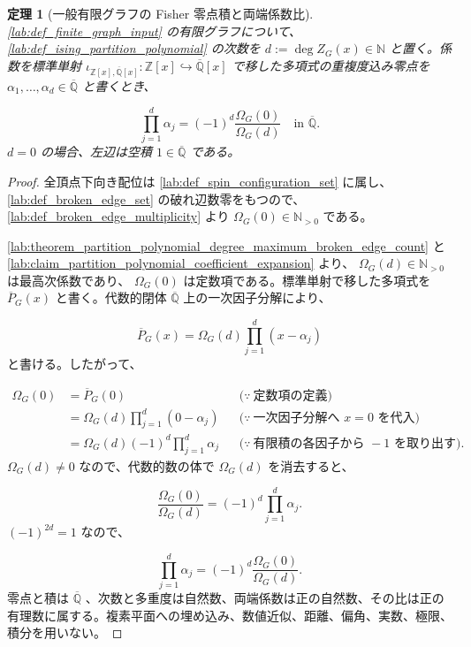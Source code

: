 \documentclass[11pt,a4paper]{article}
\newtheorem{theorem}[definition]{定理}
\theoremstyle{remark}
\begin{document}
\begin{theorem}[一般有限グラフの Fisher 零点積と両端係数比]\label{lab:theorem_fisher_zero_product_coefficient_ratio}
\cref{lab:def_finite_graph_input}
 の有限グラフについて、
\cref{lab:def_ising_partition_polynomial}
 の次数を
$d:=\deg Z_G(x)\in\mathbb N$
 と置く。係数を標準単射
$\iota_{\mathbb Z[x],\overline{\mathbb Q}[x]}:\mathbb Z[x]\hookrightarrow\overline{\mathbb Q}[x]$
 で移した多項式の重複度込み零点を 
$\alpha_1,\ldots,\alpha_d\in\overline{\mathbb Q}$
 と書くとき、

\[\prod_{j=1}^{d}\alpha_j
=
(-1)^d\frac{\Omega_G(0)}{\Omega_G(d)}
\quad\text{in }\overline{\mathbb Q}.\]
$d=0$
 の場合、左辺は空積 
$1\in\overline{\mathbb Q}$
 である。

\end{theorem}
\begin{proof}
全頂点下向き配位は 
\cref{lab:def_spin_configuration_set}
 に属し、
\cref{lab:def_broken_edge_set}
 の破れ辺数零をもつので、
\cref{lab:def_broken_edge_multiplicity}
 より 
$\Omega_G(0)\in\mathbb N_{>0}$
 である。

\cref{lab:theorem_partition_polynomial_degree_maximum_broken_edge_count}
 と 
\cref{lab:claim_partition_polynomial_coefficient_expansion}
 より、
$\Omega_G(d)\in\mathbb N_{>0}$
 は最高次係数であり、
$\Omega_G(0)$
 は定数項である。標準単射で移した多項式を 
$\overline P_G(x)$
 と書く。代数的閉体 
$\overline{\mathbb Q}$
 上の一次因子分解により、

\[\overline P_G(x)
=
\Omega_G(d)\prod_{j=1}^{d}(x-\alpha_j)\]
と書ける。したがって、

\[\begin{aligned}
\Omega_G(0)
&=\overline P_G(0)
&&\bigl(\because\ \text{定数項の定義}\bigr)\\
&=\Omega_G(d)\prod_{j=1}^{d}(0-\alpha_j)
&&\bigl(\because\ \text{一次因子分解へ }x=0\text{ を代入}\bigr)\\
&=\Omega_G(d)(-1)^d\prod_{j=1}^{d}\alpha_j
&&\bigl(\because\ \text{有限積の各因子から }-1\text{ を取り出す}\bigr).
\end{aligned}\]
$\Omega_G(d)\ne0$
 なので、代数的数の体で 
$\Omega_G(d)$
 を消去すると、

\[\frac{\Omega_G(0)}{\Omega_G(d)}
=
(-1)^d\prod_{j=1}^{d}\alpha_j.\]
$(-1)^{2d}=1$
 なので、

\[\prod_{j=1}^{d}\alpha_j
=
(-1)^d\frac{\Omega_G(0)}{\Omega_G(d)}.\]
零点と積は 
$\overline{\mathbb Q}$
、次数と多重度は自然数、両端係数は正の自然数、その比は正の有理数に属する。複素平面への埋め込み、数値近似、距離、偏角、実数、極限、積分を用いない。

\end{proof}
\end{document}
